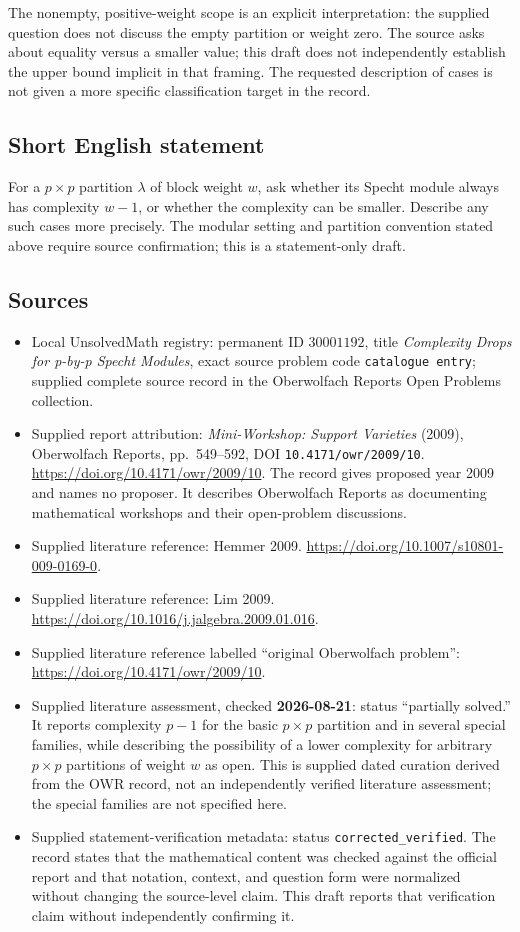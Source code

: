 \documentclass[11pt]{article}
\begin{document}
The nonempty, positive-weight scope is an explicit interpretation: the supplied question does not discuss the empty partition or weight zero. The source asks about equality versus a smaller value; this draft does not independently establish the upper bound implicit in that framing. The requested description of cases is not given a more specific classification target in the record.
\subsection{Short English statement}
For a \(p\times p\) partition \(\lambda\) of block weight \(w\), ask whether its Specht module always has complexity \(w-1\), or whether the complexity can be smaller. Describe any such cases more precisely. The modular setting and partition convention stated above require source confirmation; this is a statement-only draft.
\subsection{Sources}
\begin{itemize}
\item Local UnsolvedMath registry: permanent ID \(30001192\), title \emph{Complexity Drops for p-by-p Specht Modules}, exact source problem code \texttt{catalogue entry}; supplied complete source record in the Oberwolfach Reports Open Problems collection.
\item Supplied report attribution: \emph{Mini-Workshop: Support Varieties} (2009), Oberwolfach Reports, pp.\ 549--592, DOI \texttt{10.4171/owr/2009/10}. \url{https://doi.org/10.4171/owr/2009/10}. The record gives proposed year 2009 and names no proposer. It describes Oberwolfach Reports as documenting mathematical workshops and their open-problem discussions.
\item Supplied literature reference: Hemmer 2009. \url{https://doi.org/10.1007/s10801-009-0169-0}.
\item Supplied literature reference: Lim 2009. \url{https://doi.org/10.1016/j.jalgebra.2009.01.016}.
\item Supplied literature reference labelled ``original Oberwolfach problem'': \url{https://doi.org/10.4171/owr/2009/10}.
\item Supplied literature assessment, checked \textbf{2026-08-21}: status ``partially solved.'' It reports complexity \(p-1\) for the basic \(p\times p\) partition and in several special families, while describing the possibility of a lower complexity for arbitrary \(p\times p\) partitions of weight \(w\) as open. This is supplied dated curation derived from the OWR record, not an independently verified literature assessment; the special families are not specified here.
\item Supplied statement-verification metadata: status \texttt{corrected\_verified}. The record states that the mathematical content was checked against the official report and that notation, context, and question form were normalized without changing the source-level claim. This draft reports that verification claim without independently confirming it.
\end{itemize}
\end{document}
